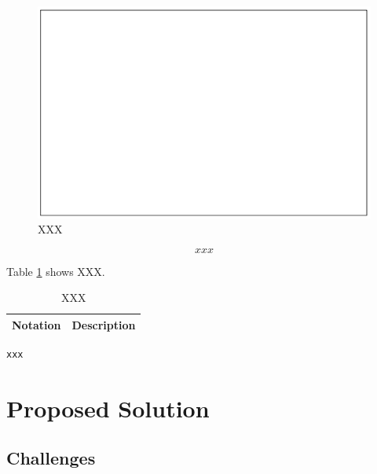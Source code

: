 \documentclass[11pt]{report}
\begin{document}
\begin{figure}[H]
	\begin{center}
		\includegraphics[width=12cm]{empty}
	\end{center}
	\caption{XXX}
	\label{empty1}
\end{figure}

\begin{equation} 
xxx
\end{equation} 

Table \ref{table:xxx} shows XXX.

\begin{table}[H]
	\begin{center}
		\caption{XXX}
		\label{table:xxx}
		
		\begin{tabular}{|p{4cm}|p{8cm}|}
			\hline 
			\textbf{Notation} & \textbf{Description}\\
			\hline
            \hline
		\end{tabular}	
		
	\end{center}
\end{table}



{\small{	
\begin{verbatim}
xxx
\end{verbatim}
}}


\chapter{Proposed Solution}
\section{Challenges}
\end{document}
